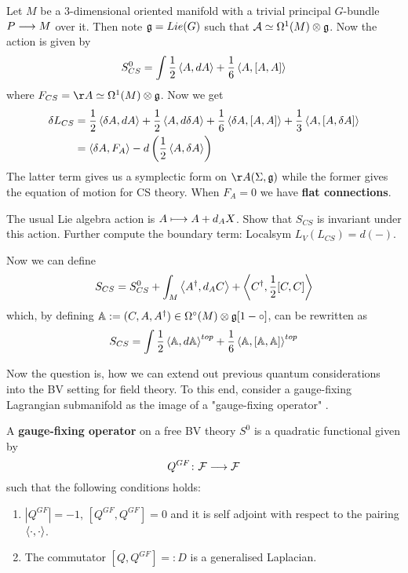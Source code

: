 \begin{example}
  Let $M$ be a $3$-dimensional oriented manifold with a trivial principal $G$-bundle $P \longrightarrow M$ over it. Then note $\mathfrak{g} = Lie(G)$ such that $\mathcal{A} \simeq \Omega^1(M) \otimes \mathfrak{g}$. Now the action is given by
  \begin{equation}
    S_{CS}^0 = \int \frac{1}{2} \left\langle A , dA \right\rangle + \frac{1}{6} \left\langle A , [A,A] \right\rangle
  \end{equation}
  where $F_{CS} = \AA \simeq \Omega^1(M) \otimes \gf$. Now we get
  \begin{align}
    \delta L_{CS} &= \frac{1}{2} \left\langle \delta A , dA \right\rangle + \frac{1}{2} \left\langle A , d \delta A \right\rangle + \frac{1}{6} \left\langle \delta A , [A,A] \right\rangle + \frac{1}{3} \left\langle A , [A,\delta A] \right\rangle \\
    &= \left\langle \delta A , F_A \right\rangle - d \left( \frac{1}{2} \left\langle A , \delta A \right\rangle \right)
  \end{align}
  The latter term gives us a symplectic form on $\AA(\Sigma, \gf)$ while the former gives the equation of motion for CS theory. When $F_A = 0$ we have \textbf{flat connections}.

  \begin{ex}
    The usual Lie algebra action is $A \longmapsto A + d_A X$. Show that $S_{CS}$ is invariant under this action. Further compute the boundary term: Localsym $L_V (L_{CS}) = d(-)$.
  \end{ex}

  Now we can define
  \begin{equation}
    S_{CS} = S_{CS}^0 + \int_M \left\langle A^\dagger , d_A C \right\rangle + \left\langle C^\dagger , \frac{1}{2}[C,C] \right\rangle
  \end{equation}
  which, by defining $\mathbb{A} := (C,A,A^\dagger) \in \Omega^\circ (M) \otimes \mathfrak{g}[1- \circ]$, can be rewritten as
  \begin{equation}
    S_{CS} = \int \frac{1}{2} \left\langle \mathbb{A} , d\mathbb{A} \right\rangle^{top} + \frac{1}{6} \left\langle \mathbb{A} , [\mathbb{A}, \mathbb{A}] \right\rangle^{top}
  \end{equation}
\end{example}

Now the question is, how we can extend out previous quantum considerations into the BV setting for field theory. To this end, consider a gauge-fixing Lagrangian submanifold as the image of a "gauge-fixing operator" \cite{Costello}.

\begin{definition}
  A \textbf{gauge-fixing operator} on a free BV theory $S^0$ is a quadratic functional given by
  \begin{equation}
    Q^{GF} \colon {\mathcal{F}} \longrightarrow {\mathcal{F}}
  \end{equation}
  such that the following conditions holds:
  \begin{enumerate}
    \item $|Q^{GF}| = -1$, $[Q^{GF}, Q^{GF}] = 0$ and it is self adjoint with respect to the pairing $\left\langle \cdot , \cdot \right\rangle$.
    \item The commutator $[Q, Q^{GF}] =: D$ is a generalised Laplacian.
  \end{enumerate}
\end{definition}

